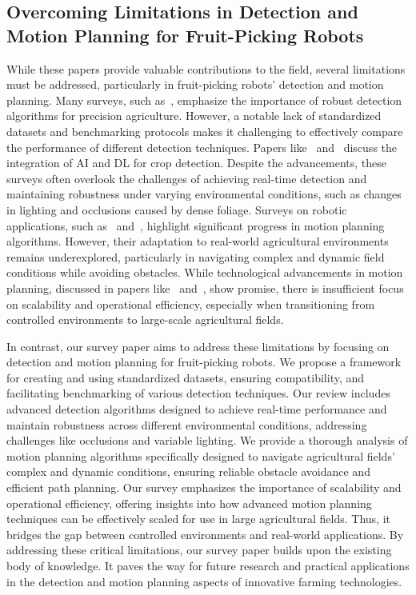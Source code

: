 \documentclass[a4paper,fleqn]{cas-dc}
\begin{document}
\subsection{Overcoming Limitations in Detection and Motion Planning for Fruit-Picking Robots}
While these papers provide valuable contributions to the field, several limitations must be addressed, particularly in fruit-picking robots' detection and motion planning.
Many surveys, such as~\cite{lu2020survey}, emphasize the importance of robust detection algorithms for precision agriculture. However, a notable lack of standardized datasets and benchmarking protocols makes it challenging to effectively compare the performance of different detection techniques.
Papers like~\cite{mohamed2021smart} and~\cite{darwin2021recognition} discuss the integration of AI and DL for crop detection. Despite the advancements, these surveys often overlook the challenges of achieving real-time detection and maintaining robustness under varying environmental conditions, such as changes in lighting and occlusions caused by dense foliage.
Surveys on robotic applications, such as~\cite{ampatzidis2017ipathology} and~\cite{zhou2022intelligent}, highlight significant progress in motion planning algorithms. However, their adaptation to real-world agricultural environments remains underexplored, particularly in navigating complex and dynamic field conditions while avoiding obstacles. 
While technological advancements in motion planning, discussed in papers like~\cite{jia2020apple} and~\cite{zhang2020technology}, show promise, there is insufficient focus on scalability and operational efficiency, especially when transitioning from controlled environments to large-scale agricultural fields.
 
In contrast, our survey paper aims to address these limitations by focusing on detection and motion planning for fruit-picking robots. We propose a framework for creating and using standardized datasets, ensuring compatibility, and facilitating benchmarking of various detection techniques. 
Our review includes advanced detection algorithms designed to achieve real-time performance and maintain robustness across different environmental conditions, addressing challenges like occlusions and variable lighting.
We provide a thorough analysis of motion planning algorithms specifically designed to navigate agricultural fields' complex and dynamic conditions, ensuring reliable obstacle avoidance and efficient path planning.
Our survey emphasizes the importance of scalability and operational efficiency, offering insights into how advanced motion planning techniques can be effectively scaled for use in large agricultural fields. Thus, it bridges the gap between controlled environments and real-world applications.
By addressing these critical limitations, our survey paper builds upon the existing body of knowledge. It paves the way for future research and practical applications in the detection and motion planning aspects of innovative farming technologies.
\end{document}
